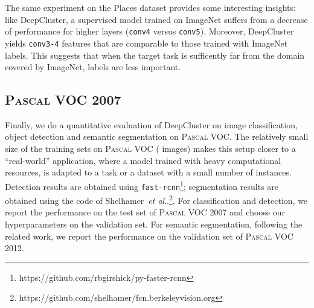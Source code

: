 \documentclass[runningheads]{llncs}
\makeatletter
\DeclareRobustCommand\onedot{\futurelet\@let@token\@onedot}
\def\@onedot{\ifx\@let@token.\else.\null\fi\xspace}
\def\etal{\emph{et al}\onedot}
\def\OURS{DeepCluster\xspace}
\makeatother
\begin{document}
The same experiment on the Places dataset provides some interesting insights:
like \OURS, a supervised model trained on ImageNet suffers from a decrease of performance for higher layers (\texttt{conv4} versus \texttt{conv5}).
Moreover, \OURS yields \texttt{conv3-4} features that are comparable to those trained with ImageNet labels.
This suggests that when the target task is sufficently far from the domain covered by ImageNet, labels are less important.




\subsection{\textsc{Pascal} VOC 2007}
\label{sec:pascal}
Finally, we do a quantitative evaluation of \OURS on image classification, object detection and semantic segmentation on \textsc{Pascal} VOC.
The relatively small size of the training sets on \textsc{Pascal} VOC ( images) makes this setup closer to a ``real-world'' application,
where a model trained with heavy computational resources, is adapted to a task or a dataset with a small number of instances.
Detection results are obtained using \texttt{fast-rcnn}\footnote{https://github.com/rbgirshick/py-faster-rcnn}; segmentation results are obtained using the code of Shelhamer~\etal\footnote{https://github.com/shelhamer/fcn.berkeleyvision.org}.
For classification and detection, we report the performance on the test set of \textsc{Pascal} VOC 2007 and choose our hyperparameters on the validation set.
For semantic segmentation, following the related work, we report the performance on the validation set of \textsc{Pascal} VOC 2012.
\end{document}
